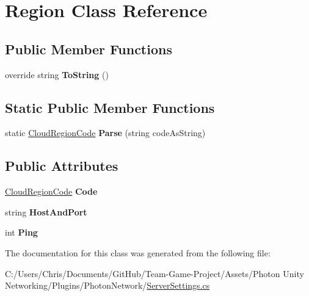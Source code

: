 \hypertarget{class_region}{}\section{Region Class Reference}
\label{class_region}
\subsection*{Public Member Functions}
\begin{DoxyCompactItemize}
\item 
override string {\bfseries To\+String} ()\hypertarget{class_region_ab5ea75ba87f49f1bf46b1a257b6f4d9e}{}\label{class_region_ab5ea75ba87f49f1bf46b1a257b6f4d9e}

\end{DoxyCompactItemize}
\subsection*{Static Public Member Functions}
\begin{DoxyCompactItemize}
\item 
static \hyperlink{_enums_8cs_af823e3be9567fa753720895120c9819b}{Cloud\+Region\+Code} {\bfseries Parse} (string code\+As\+String)\hypertarget{class_region_a8ffb04f77e0274519d29b6987c50aea0}{}\label{class_region_a8ffb04f77e0274519d29b6987c50aea0}

\end{DoxyCompactItemize}
\subsection*{Public Attributes}
\begin{DoxyCompactItemize}
\item 
\hyperlink{_enums_8cs_af823e3be9567fa753720895120c9819b}{Cloud\+Region\+Code} {\bfseries Code}\hypertarget{class_region_a44c13a3119bebc2afd0295ac2ef6adb4}{}\label{class_region_a44c13a3119bebc2afd0295ac2ef6adb4}

\item 
string {\bfseries Host\+And\+Port}\hypertarget{class_region_a5dc3538ba137c2e09e72a79e6ee5a786}{}\label{class_region_a5dc3538ba137c2e09e72a79e6ee5a786}

\item 
int {\bfseries Ping}\hypertarget{class_region_a39045fbf04de42df3f1e1dbd1ec53581}{}\label{class_region_a39045fbf04de42df3f1e1dbd1ec53581}

\end{DoxyCompactItemize}


The documentation for this class was generated from the following file\+:\begin{DoxyCompactItemize}
\item 
C\+:/\+Users/\+Chris/\+Documents/\+Git\+Hub/\+Team-\/\+Game-\/\+Project/\+Assets/\+Photon Unity Networking/\+Plugins/\+Photon\+Network/\hyperlink{_server_settings_8cs}{Server\+Settings.\+cs}\end{DoxyCompactItemize}
